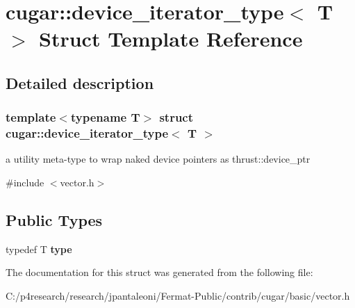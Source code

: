 \hypertarget{structcugar_1_1device__iterator__type}{}\section{cugar\+:\+:device\+\_\+iterator\+\_\+type$<$ T $>$ Struct Template Reference}
\label{structcugar_1_1device__iterator__type}


\subsection{Detailed description}
\subsubsection*{template$<$typename T$>$\newline
struct cugar\+::device\+\_\+iterator\+\_\+type$<$ T $>$}

a utility meta-\/type to wrap naked device pointers as thrust\+::device\+\_\+ptr 

{\ttfamily \#include $<$vector.\+h$>$}

\subsection*{Public Types}
\begin{DoxyCompactItemize}
\item 
typedef T {\bfseries type}
\end{DoxyCompactItemize}


The documentation for this struct was generated from the following file\+:\begin{DoxyCompactItemize}
\item 
C\+:/p4research/research/jpantaleoni/\+Fermat-\/\+Public/contrib/cugar/basic/vector.\+h\end{DoxyCompactItemize}
